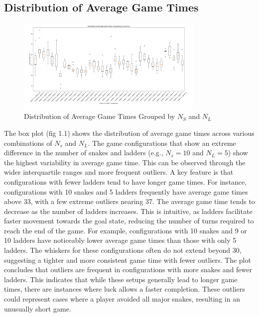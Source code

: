 \documentclass[12pt]{report}
\begin{document}
	\subsection{Distribution of Average Game Times}
		\begin{figure}[h]
			\centering
			\includegraphics[width=0.8\textwidth]{BoxPlots}
			\caption{Distribution of Average Game Times Grouped by $N_{S}$ and $N_{L}$}
			\label{fig:boxplots}
		\end{figure}
	
	The box plot (fig 1.1) shows the distribution of average game times across various combinations of $N_{s}$ and $N_{L}$. The game configurations that show an extreme difference in the number of snakes and ladders (e.g., $N_{s} = 10$ and $N_{L} = 5$) show the highest variability in average game time. This can be observed through the wider interquartile ranges and more frequent outliers. A key feature is that configurations with fewer ladders tend to have longer game times. For instance, configurations with 10 snakes and 5 ladders frequently have average game times above 33, with a few extreme outliers nearing 37. The average game time tends to decrease as the number of ladders increases. This is intuitive, as ladders facilitate faster movement towards the goal state, reducing the number of turns required to reach the end of the game. For example, configurations with 10 snakes and 9 or 10 ladders have noticeably lower average game times than those with only 5 ladders. The whiskers for these configurations often do not extend beyond 30, suggesting a tighter and more consistent game time with fewer outliers. The plot concludes that outliers are frequent in configurations with more snakes and fewer ladders. This indicates that while these setups generally lead to longer game times, there are instances where luck allows a faster completion. These outliers could represent cases where a player avoided all major snakes, resulting in an unusually short game.
	
\end{document}
